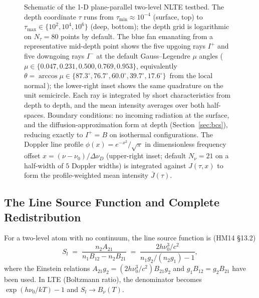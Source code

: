 \documentclass[11pt]{article}
\newcommand{\Jbar}{\bar{J}}
\newcommand{\Bnu}{B_{\nu}}
\begin{document}
\begin{figure}[ht]
\caption{Schematic of the 1-D plane-parallel two-level NLTE testbed.
The depth coordinate $\tau$ runs from $\tau_{\min} \approx 10^{-4}$
(surface, top) to $\tau_{\max} \in \{10^2, 10^4, 10^6\}$ (deep, bottom);
the depth grid is logarithmic on $N_\tau = 80$ points by default.
The blue fan emanating from a representative mid-depth point shows the
five upgoing rays $I^+$ and five downgoing rays $I^-$ at the default
Gauss--Legendre $\mu$ angles (\,$\mu \in \{0.047, 0.231, 0.500, 0.769,
0.953\}$, equivalently $\theta = \arccos\mu \in
\{87.3^\circ, 76.7^\circ, 60.0^\circ, 39.7^\circ, 17.6^\circ\}$\,
from the local normal\,); the lower-right inset shows the same
quadrature on the unit semicircle.  Each ray is integrated by short
characteristics from depth to depth, and the mean intensity averages
over both half-spaces.  Boundary conditions: no incoming radiation at
the surface, and the diffusion-approximation form at depth
(Section~\ref{sec:bcs}), reducing exactly to $I^+ = B$ on isothermal
configurations.  The Doppler line profile $\phi(x) = e^{-x^2}/\sqrt{\pi}$
in dimensionless frequency offset $x = (\nu - \nu_0)/\Delta\nu_D$
(upper-right inset; default $N_\nu = 21$ on a half-width of $5$
Doppler widths) is integrated against $J(\tau, x)$ to form the
profile-weighted mean intensity $\Jbar(\tau)$.}
\label{fig:1d-setup}
\end{figure}

\subsection{The Line Source Function and Complete Redistribution}

For a two-level atom with no continuum, the line source function is
(HM14 §13.2)
\begin{equation}
S_l \;=\; \frac{n_2 A_{21}}{n_1 B_{12} - n_2 B_{21}}
\;=\; \frac{2 h \nu_0^3 / c^2}{n_1 g_2 / (n_2 g_1) - 1},
\label{eq:source-sl-pop}
\end{equation}
where the Einstein relations $A_{21} g_2 = (2 h \nu_0^3 / c^2) B_{21} g_2$
and $g_1 B_{12} = g_2 B_{21}$ have been used. In LTE (Boltzmann ratio), the
denominator becomes $\exp(h\nu_0 / kT) - 1$ and $S_l \to \Bnu(T)$.
\end{document}
